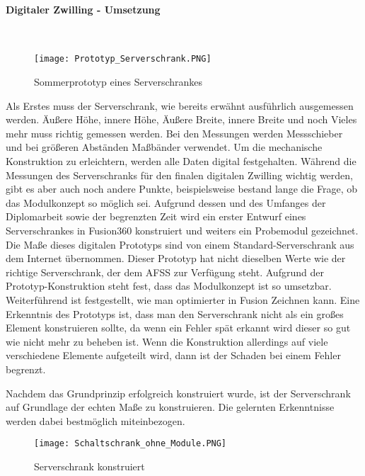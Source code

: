     \paragraph{Digitaler Zwilling - Umsetzung}\mbox{}\\ 

    \begin{wrapfigure}{r}{0.3\textwidth}
        \vspace{-20px}
        \texttt{[image: Prototyp\_Serverschrank.PNG]}
        \caption{Sommerprototyp eines Serverschrankes}
        \vspace{-20px}
        \label{fig:Sommerprototyp}
    \end{wrapfigure}
    Als Erstes muss der Serverschrank, wie bereits erwähnt ausführlich ausgemessen werden. Äußere Höhe, innere Höhe, Äußere Breite, innere Breite und noch Vieles mehr muss richtig gemessen werden.    
    Bei den Messungen werden Messschieber und bei größeren Abständen Maßbänder verwendet. Um die mechanische Konstruktion zu erleichtern, werden alle Daten digital festgehalten.   
    Während die Messungen des Serverschranks für den finalen digitalen Zwilling wichtig werden, gibt es aber auch noch andere Punkte, beispielsweise bestand lange die Frage, ob das Modulkonzept so möglich sei. Aufgrund dessen und des Umfanges der Diplomarbeit sowie der begrenzten Zeit wird ein erster Entwurf eines Serverschrankes in Fusion360 konstruiert und weiters ein Probemodul gezeichnet. Die Maße dieses digitalen Prototyps sind von einem Standard-Serverschrank aus dem Internet übernommen.
    Dieser Prototyp hat nicht dieselben Werte wie der richtige Serverschrank, der dem AFSS zur Verfügung steht. Aufgrund der Prototyp-Konstruktion steht fest, dass das Modulkonzept ist so umsetzbar. Weiterführend ist festgestellt, wie man optimierter in Fusion Zeichnen kann.
    Eine Erkenntnis des Prototyps ist, dass man den Serverschrank nicht als ein großes Element konstruieren sollte, da wenn ein Fehler spät erkannt wird dieser so gut wie nicht mehr zu beheben ist. Wenn die Konstruktion allerdings auf viele verschiedene Elemente aufgeteilt wird, dann ist der Schaden bei einem Fehler begrenzt. 

    Nachdem das Grundprinzip erfolgreich konstruiert wurde, ist der Serverschrank auf Grundlage der echten Maße zu konstruieren. Die gelernten Erkenntnisse werden dabei bestmöglich miteinbezogen.\\    
    \begin{wrapfigure}{r}{0.35\textwidth} %
        \vspace{-20px}
        \texttt{[image: Schaltschrank\_ohne\_Module.PNG]} 
        \caption{Serverschrank konstruiert}
        \vspace{-50px}
        \label{fig:Clean_Serverschrank}
    \end{wrapfigure}

